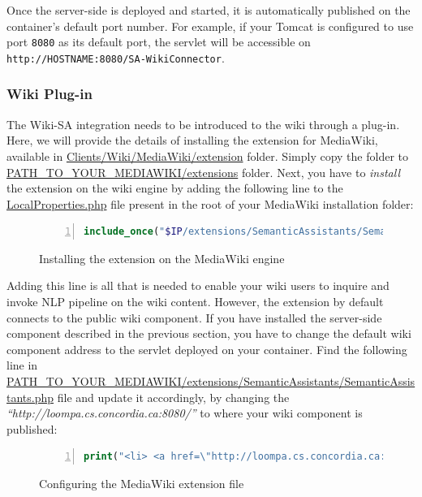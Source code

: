 Once the server-side is deployed and started, it is automatically published on the container's default port number. For example, if your Tomcat is configured to use port \texttt{8080} as its default port, the servlet will be accessible on \texttt{http://HOSTNAME:8080/SA-WikiConnector}.

\subsubsection{Wiki Plug-in}
The Wiki-SA integration needs to be introduced to the wiki through a plug-in. Here, we will provide the details of installing the \sa extension for MediaWiki, available in \url{Clients/Wiki/MediaWiki/extension} folder. Simply copy the \texttt{\sa} folder to \url{PATH_TO_YOUR_MEDIAWIKI/extensions} folder. Next, you have to \emph{install} the extension on the wiki engine by adding the following line to the \url{LocalProperties.php} file present in the root of your MediaWiki installation folder:

\begin{figure}[h!]
\centering
\begin{lstlisting}[language=PHP,numbers=left,xleftmargin=4mm,columns=flexible]
include_once("$IP/extensions/SemanticAssistants/SemanticAssistants.php");
\end{lstlisting}
\caption{Installing the \sa extension on the MediaWiki engine}
\label{list:mediawiki_sa_extension_install}
\end{figure}

Adding this line is all that is needed to enable your wiki users to inquire and invoke NLP pipeline on the wiki content. However, the extension by default connects to the public \sa wiki component. If you have installed the server-side component described in the previous section, you have to change the default wiki component address to the servlet deployed on your container. Find the following line in \url{PATH_TO_YOUR_MEDIAWIKI/extensions/SemanticAssistants/SemanticAssistants.php} file and update it accordingly, by changing the \emph{``http://loompa.cs.concordia.ca:8080/''} to where your wiki component is published:

\begin{figure}[h!]
\centering
\begin{lstlisting}[language=PHP,numbers=left,xleftmargin=4mm,columns=flexible]
print("<li> <a href=\"http://loompa.cs.concordia.ca:8080/SA-WikiConnector/SemAssistServlet?action=proxy\">Semantic Assistants</a></li>");\end{lstlisting}
\caption{Configuring the \sa MediaWiki extension file}
\label{list:mediawiki_sa_extension_config}
\end{figure}

